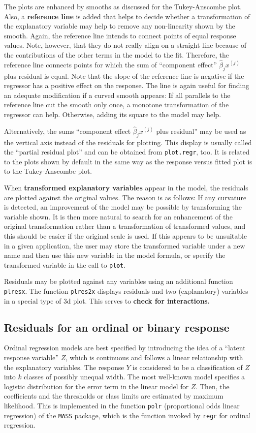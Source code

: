 \documentclass{article}
\providecommand{\T}{\texttt}
\providecommand{\ul}{\textbf}
\begin{document}
The plots are enhanced by smooths as discussed for the Tukey-Anscombe
plot. 
Also, a \textbf{reference line} is added that helps to decide whether a
transformation of the explanatory variable may help to remove any
non-linearity shown by the smooth.
Again, the reference line intends to connect points of equal response
values. Note, however, that they do not really align on a straight line
because of the contributions of the other terms in the model to the fit.
Therefore, the reference line connects points for which the sum of 
``component effect'' $\widehat\beta_j x^{(j)}$ plus residual is equal.
Note that the slope of the reference line is negative if the regressor has
a positive effect on the response.
The line is again useful for finding an adequate modification if a curved
smooth appears: If all parallels to the reference line cut the smooth only
once, a monotone transformation of the regressor can help. 
Otherwise, adding its square to the model may help.

Alternatively, the sums 
``component effect $\widehat\beta_j x^{(j)}$ plus residual''
may be used as the vertical axis instead of the
residuals for plotting. This display is usually called the 
``partial residual plot'' and can be obtained from \T{plot.regr}, too. 
It is related to the plots shown by default in the same way as the
response versus fitted plot is to the Tukey-Anscombe plot.

When \ul{transformed explanatory variables} appear in the model, the
residuals are plotted against the original values. The reason is as
follows: If any curvature is detected, an improvement of the model may be
possible by transforming the variable shown. It is then more natural
to search for an enhancement of the original transformation rather than 
a transformation of transformed values, and this should be easier if 
the original scale is used.
If this appears to be unsuitable in a given application, the user
may store the transformed variable under a new name and then use 
this new variable in the model formula, or specify the transformed 
variable in the call to \T{plot}.

Residuals may be plotted against any variables using an additional function 
\T{plresx}. The function \T{plres2x} displays residuals and two
(explanatory) variables in a special type of 3d plot. This serves to 
\ul{check for interactions.}

\subsection{Residuals for an ordinal or binary response}
Ordinal regression models are best specified by introducing the idea of a 
``latent response variable'' $Z$, which is continuous and follows a linear
relationship with the explanatory variables. 
The response $Y$ is considered to be a classification of $Z$ into $k$
classes of possibly unequal width. The most well-known model specifies a 
logistic distribution for the error term in the linear model for $Z$.
Then, the coefficients and the thresholds or class limits are estimated by
maximum likelihood. This is implemented in the function \T{polr} 
(proportional odds linear regression) of the \T{MASS} package, 
which is the function invoked by \T{regr} for ordinal regression.
\end{document}
